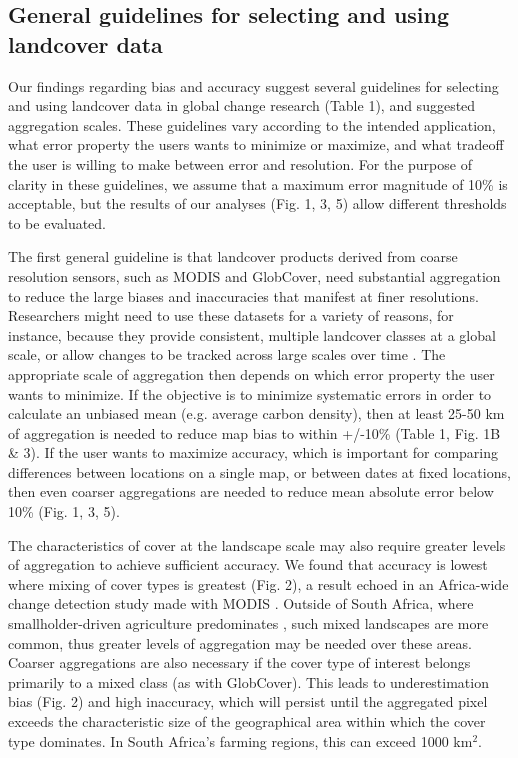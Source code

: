 \documentclass{pnastwo2}
\begin{document}
\begin{article}
\subsection{General guidelines for selecting and using landcover data}
Our findings regarding bias and accuracy suggest several guidelines for selecting and using landcover data in global change research (Table 1), and suggested aggregation scales. These guidelines vary according to the intended application, what error property the users wants to minimize or maximize, and what tradeoff the user is willing to make between error and resolution.  For the purpose of clarity in these guidelines, we assume that a maximum error magnitude of 10\% is acceptable, but the results of our analyses (Fig. 1, 3, 5) allow different thresholds to be  evaluated.  

The first general guideline is that landcover products derived from coarse resolution sensors, such as MODIS and GlobCover, need substantial aggregation to reduce the large biases and inaccuracies that manifest at finer resolutions. Researchers might need to use these datasets for a variety of reasons, for instance, because they provide consistent, multiple landcover classes at a global scale, or allow changes to be tracked across large scales over time \cite{luoto_predicting_2004}. The appropriate scale of aggregation then depends on which error property the user wants to minimize. If the objective is to minimize systematic errors in order to calculate an unbiased mean (e.g. average carbon density), then at least 25-50 km of aggregation is needed to reduce map bias to within +/-10\% (Table 1, Fig. 1B \& 3). If the user wants to maximize accuracy, which is important for comparing differences between locations on a single map, or between dates at fixed locations, then even coarser aggregations are needed to reduce mean absolute error below 10\% (Fig. 1, 3, 5).  

The characteristics of cover at the landscape scale may also require greater levels of aggregation to achieve sufficient accuracy. We found that accuracy is lowest where mixing of cover types is greatest (Fig. 2), a result echoed in an Africa-wide change detection study made with MODIS \cite{gross_monitoring_2013}. Outside of South Africa, where smallholder-driven agriculture predominates \cite{lambin_estimating_????}, such mixed landscapes are more common, thus greater levels of aggregation may be needed over these areas. Coarser aggregations are also necessary if the cover type of interest belongs primarily to a mixed class (as with GlobCover). This leads to underestimation bias (Fig. 2) and high inaccuracy, which will persist until the aggregated pixel exceeds the characteristic size of the geographical area within which the cover type dominates. In South Africa's farming regions, this can exceed 1000 km$^2$. 


\end{article}
\end{document}
